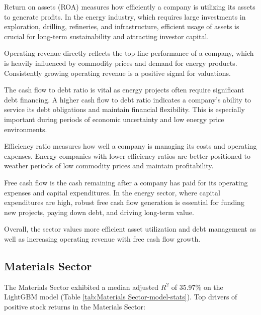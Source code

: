 \documentclass[12pt,a4paper,english]{article}
\begin{document}
Return on assets (ROA) measures how efficiently a company is utilizing its assets to generate profits. In the energy industry, which requires large investments in exploration, drilling, refineries, and infrastructure, efficient usage of assets is crucial for long-term sustainability and attracting investor capital.

Operating revenue directly reflects the top-line performance of a company, which is heavily influenced by commodity prices and demand for energy products. Consistently growing operating revenue is a positive signal for valuations.

The cash flow to debt ratio is vital as energy projects often require significant debt financing. A higher cash flow to debt ratio indicates a company's ability to service its debt obligations and maintain financial flexibility. This is especially important during periods of economic uncertainty and low energy price environments.

Efficiency ratio measures how well a company is managing its costs and operating expenses. Energy companies with lower efficiency ratios are better positioned to weather periods of low commodity prices and maintain profitability.

Free cash flow is the cash remaining after a company has paid for its operating expenses and capital expenditures. In the energy sector, where capital expenditures are high, robust free cash flow generation is essential for funding new projects, paying down debt, and driving long-term value.

Overall, the sector values more efficient asset utilization and debt management as well as increasing operating revenue with free cash flow growth.

\subsection{Materials Sector}
\label{sec:materials}

The Materials Sector exhibited a median adjusted $R^2$ of 35.97\% on the LightGBM model (Table \ref{tab:Materials Sector-model-stats}). Top drivers of positive stock returns in the Materials Sector:

\end{document}
